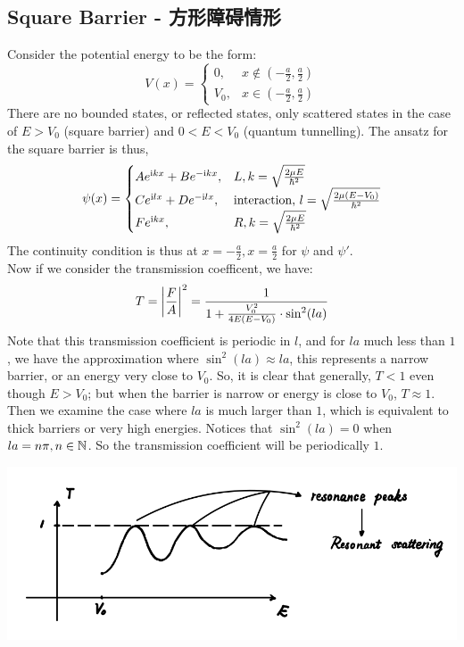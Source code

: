 \subsection{Square Barrier - 方形障碍情形}
Consider the potential energy to be the form:
$$V(x) = \begin{cases}
    0, & x \notin (-\frac{a}{2}, \frac{a}{2}) \\
    V_0, & x \in (-\frac{a}{2}, \frac{a}{2})
\end{cases}$$
There are no bounded states, or reflected states, only scattered states in the case of $E > V_0$ (square barrier) and $0 < E < V_0$ (quantum tunnelling). The ansatz for the square barrier is thus,
$$\psi(x) = \begin{cases}
    Ae^{\mathrm{i} k x} + Be^{-\mathrm{i} k x}, & L, k = \sqrt{\frac{2\mu E}{\hbar^2}} \\
    Ce^{\mathrm{i} l x} + De^{-\mathrm{i} l x}, & \text{interaction, } l = \sqrt{\frac{2\mu(E - V_0)}{\hbar^2}} \\
    Fe^{\mathrm{i} k x}, & R, k = \sqrt{\frac{2\mu E}{\hbar^2}}
\end{cases}$$
The continuity condition is thus at $x = -\frac{a}{2}, x = \frac{a}{2}$ for $\psi$ and $\psi'$. \\
Now if we consider the transmission coefficent, we have:
$$T = \abs{\frac{F}{A}}^2 = \frac{1}{1 + \frac{V_0^2}{4E(E-V_0)} \cdot \sin^2(la)}$$
Note that this transmission coefficient is periodic in $l$, and for $la$ much less than $1$, we have the approximation where $\sin^2(la) \approx la$, this represents a narrow barrier, or an energy very close to $V_0$. So, it is clear that generally, $T < 1$ even though $E > V_0$; but when the barrier is narrow or energy is close to $V_0$, $T \approx 1$. \\
Then we examine the case where $la$ is much larger than $1$, which is equivalent to thick barriers or very high energies. Notices that $\sin^2(la) = 0$ when $la = n\pi, n \in \mathbb{N}$. So the transmission coefficient will be periodically $1$.
\begin{center}
    \includegraphics[scale = 1]{square-barrier-transmission.png}
\end{center}
